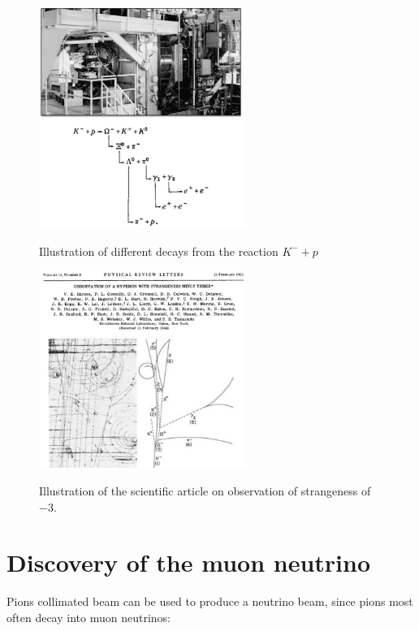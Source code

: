 \begin{figure}[ht]
    \centering
    \includegraphics[width=0.6\textwidth]{Figures/FNSN31_11.JPG}
    \label{fig:omega-0}
    \caption{Illustration of different decays from the reaction $K^-+p$}
\end{figure}
 
\begin{figure}[!h]
    \centering
    \includegraphics[width=0.6\textwidth]{Figures/FNSN31_12.JPG}
    \label{fig:omega-1}
    \caption{Illustration of the scientific article on observation of strangeness of $-3$.}
\end{figure}

\section{Discovery of the muon neutrino}

Pions collimated beam can be used to produce a neutrino beam,  since pions most often decay into muon neutrinos:

